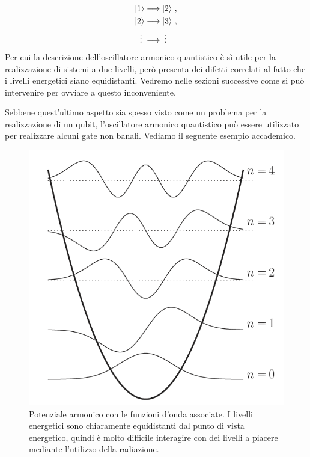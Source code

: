 \begin{align*}
    \ket{1} &\longrightarrow \ket{2} \, , \\
    \ket{2} &\longrightarrow \ket{3} \, , \\
    \vdots \; &\longrightarrow \; \vdots
\end{align*}
Per cui la descrizione dell'oscillatore armonico quantistico è sì utile per la realizzazione di sistemi a due livelli, però presenta dei difetti correlati al fatto che i livelli energetici siano equidistanti. Vedremo nelle sezioni successive come si può intervenire per ovviare a questo inconveniente.

\noindent Sebbene quest'ultimo aspetto sia spesso visto come un problema per la realizzazione di un qubit, l'oscillatore armonico quantistico può essere utilizzato per realizzare alcuni gate non banali. Vediamo il seguente esempio accademico.

\begin{figure}[!t]
    \centering
    \includegraphics[scale=0.6]{images/qho.png}
    \caption{Potenziale armonico con le funzioni d'onda associate. I livelli energetici sono chiaramente equidistanti dal punto di vista energetico, quindi è molto difficile interagire con dei livelli a piacere mediante l'utilizzo della radiazione.}
    \label{fig:qha}
\end{figure}

